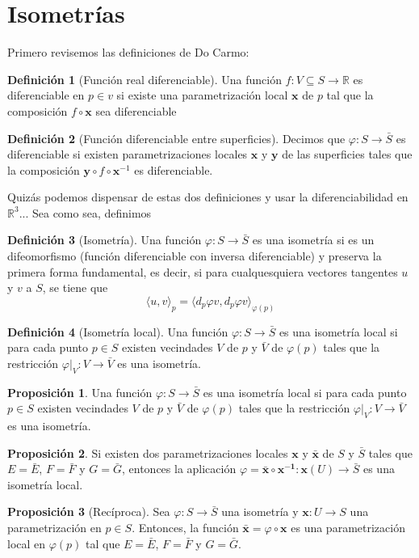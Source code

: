 \documentclass[spanish]{book}
\theoremstyle{definition}
\newtheorem*{defn}{Definición}
\newtheorem*{prop}{Proposición}
\newcommand{\R}{\mathbb{R}}
\begin{document}
\section{Isometrías}
Primero revisemos las definiciones de Do Carmo:
\begin{defn}[Función real diferenciable]
	Una función $f:V\subseteq S\to \R$ es diferenciable en $p\in v$ si existe una parametrización local $\mathbf{x}$ de $p$ tal que la composición $f\circ\mathbf{x}$ sea diferenciable
\end{defn}
\begin{defn}[Función diferenciable entre superficies]
	Decimos que $\varphi:S\to\bar{S}$ es diferenciable si existen parametrizaciones locales $\mathbf{x}$ y $\mathbf{y}$ de las superficies tales que la composición $\mathbf{y}\circ f\circ\mathbf{x}^{-1}$ es diferenciable.
\end{defn}
Quizás podemos dispensar de estas dos definiciones y usar la diferenciabilidad en $\R^3$... Sea como sea, definimos
\begin{defn}[Isometría]
	Una función $\varphi:S\to\bar{S}$ es una isometría si es un difeomorfismo (función diferenciable con inversa diferenciable) y preserva la primera forma fundamental, es decir, si para cualquesquiera vectores tangentes $u$ y $v$ a $S$, se tiene que
	$$
	\langle u,v\rangle_p=\langle d_p\varphi v,d_p\varphi v\rangle_{\varphi(p)}
	$$
\end{defn}
\begin{defn}[Isometría local]
	Una función $\varphi:S\to\bar{S}$ es una isometría local si para cada punto $p\in S$ existen vecindades $V$ de $p$ y $\bar{V}$ de $\varphi(p)$ tales que la restricción $\varphi|_{V}:V\to\bar{V}$ es una isometría.
\end{defn}
\begin{prop}
	Una función $\varphi:S\to\bar{S}$ es una isometría local si para cada punto $p\in S$ existen vecindades $V$ de $p$ y $\bar{V}$ de $\varphi(p)$ tales que la restricción $\varphi|_{V}:V\to\bar{V}$ es una isometría.
\end{prop}
\begin{prop}
	Si existen dos parametrizaciones locales $\mathbf{x}$ y $\bar{\mathbf{x}}$ de $S$ y $\bar{S}$ tales que $E=\bar{E}$, $F=\bar{F}$ y $G=\bar{G}$, entonces la aplicación $\varphi=\mathbf{\bar{x}\circ\mathbf{x}^{-1}}:\mathbf{x}(U)\to\bar{S}$ es una isometría local.
\end{prop}
\begin{prop}[Recíproca]\label{prop:reciproca}
	Sea $\varphi:S\to\bar S$ una isometría y $\mathbf x:U\to S$ una parametrización en $p\in S$. Entonces, la función $\bar{\mathbf x}=\varphi\circ\mathbf{x}$  es una parametrización local en $\varphi(p)$ tal que $E=\bar{E}$, $F=\bar{F}$ y $G=\bar{G}$.
\end{prop}
\end{document}
